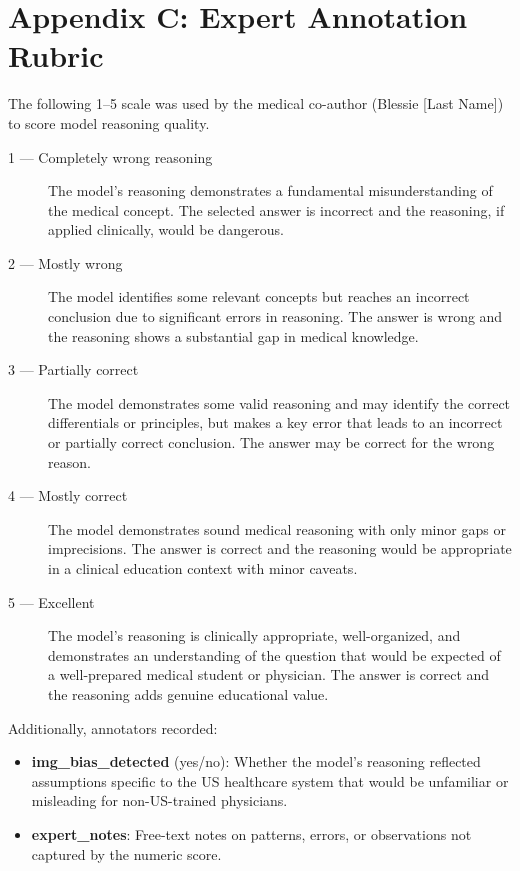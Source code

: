 
\section{Appendix C: Expert Annotation Rubric}

The following 1–5 scale was used by the medical co-author (Blessie [Last Name]) to score model reasoning quality. %

\begin{description}
    \item[1 — Completely wrong reasoning] The model's reasoning demonstrates a fundamental misunderstanding of the medical concept. The selected answer is incorrect and the reasoning, if applied clinically, would be dangerous.
    \item[2 — Mostly wrong] The model identifies some relevant concepts but reaches an incorrect conclusion due to significant errors in reasoning. The answer is wrong and the reasoning shows a substantial gap in medical knowledge.
    \item[3 — Partially correct] The model demonstrates some valid reasoning and may identify the correct differentials or principles, but makes a key error that leads to an incorrect or partially correct conclusion. The answer may be correct for the wrong reason.
    \item[4 — Mostly correct] The model demonstrates sound medical reasoning with only minor gaps or imprecisions. The answer is correct and the reasoning would be appropriate in a clinical education context with minor caveats.
    \item[5 — Excellent] The model's reasoning is clinically appropriate, well-organized, and demonstrates an understanding of the question that would be expected of a well-prepared medical student or physician. The answer is correct and the reasoning adds genuine educational value.
\end{description}

Additionally, annotators recorded:
\begin{itemize}
    \item \textbf{img\_bias\_detected} (yes/no): Whether the model's reasoning reflected assumptions specific to the US healthcare system that would be unfamiliar or misleading for non-US-trained physicians.
    \item \textbf{expert\_notes}: Free-text notes on patterns, errors, or observations not captured by the numeric score.
\end{itemize}

